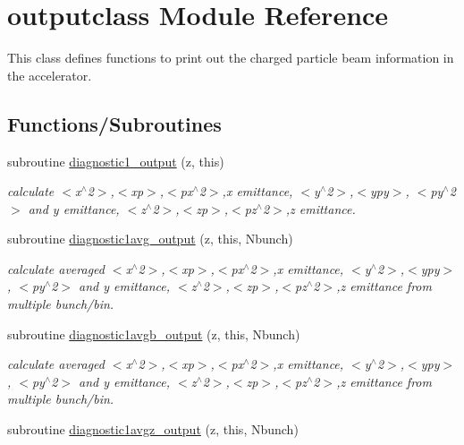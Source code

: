 \hypertarget{namespaceoutputclass}{}\section{outputclass Module Reference}
\label{namespaceoutputclass}


This class defines functions to print out the charged particle beam information in the accelerator.  


\subsection*{Functions/\+Subroutines}
\begin{DoxyCompactItemize}
\item 
subroutine \mbox{\hyperlink{namespaceoutputclass_a3b5a43f1652254e5a12880dc332a48c3}{diagnostic1\+\_\+output}} (z, this)
\begin{DoxyCompactList}\small\item\em calculate $<$x$^\wedge$2$>$,$<$xp$>$,$<$px$^\wedge$2$>$,x emittance, $<$y$^\wedge$2$>$,$<$ypy$>$, $<$py$^\wedge$2$>$ and y emittance, $<$z$^\wedge$2$>$,$<$zp$>$,$<$pz$^\wedge$2$>$,z emittance. \end{DoxyCompactList}\item 
subroutine \mbox{\hyperlink{namespaceoutputclass_ac91c3984014cb5cdc000c0422ccd08a1}{diagnostic1avg\+\_\+output}} (z, this, Nbunch)
\begin{DoxyCompactList}\small\item\em calculate averaged $<$x$^\wedge$2$>$,$<$xp$>$,$<$px$^\wedge$2$>$,x emittance, $<$y$^\wedge$2$>$,$<$ypy$>$, $<$py$^\wedge$2$>$ and y emittance, $<$z$^\wedge$2$>$,$<$zp$>$,$<$pz$^\wedge$2$>$,z emittance from multiple bunch/bin. \end{DoxyCompactList}\item 
subroutine \mbox{\hyperlink{namespaceoutputclass_a42165712a4636aa78bacdd26efa4bae9}{diagnostic1avgb\+\_\+output}} (z, this, Nbunch)
\begin{DoxyCompactList}\small\item\em calculate averaged $<$x$^\wedge$2$>$,$<$xp$>$,$<$px$^\wedge$2$>$,x emittance, $<$y$^\wedge$2$>$,$<$ypy$>$, $<$py$^\wedge$2$>$ and y emittance, $<$z$^\wedge$2$>$,$<$zp$>$,$<$pz$^\wedge$2$>$,z emittance from multiple bunch/bin. \end{DoxyCompactList}\item 
subroutine \mbox{\hyperlink{namespaceoutputclass_a4a7e188c45ca9b8099c7715873d9324a}{diagnostic1avgz\+\_\+output}} (z, this, Nbunch)

\end{DoxyCompactItemize}
